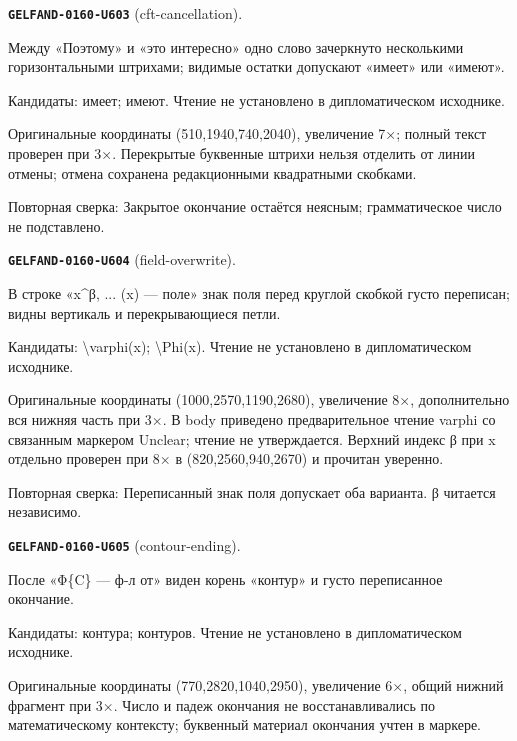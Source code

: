 \par\noindent\leavevmode{}\label{GELFAND-0160-U603}\label{GELFAND-P001483:cft-cancellation}\textbf{\texttt{GELFAND-0160-U603}} (cft-cancellation).\nopagebreak[4]\par
Между «Поэтому» и «это интересно» одно слово зачеркнуто несколькими горизонтальными штрихами; видимые остатки допускают «имеет» или «имеют».\par
Кандидаты: имеет; имеют. Чтение не установлено в дипломатическом исходнике.\par
Оригинальные координаты (510,1940,740,2040), увеличение 7×; полный текст проверен при 3×. Перекрытые буквенные штрихи нельзя отделить от линии отмены; отмена сохранена редакционными квадратными скобками.\par
Повторная сверка: Закрытое окончание остаётся неясным; грамматическое число не подставлено.\par\medskip
\par\noindent\leavevmode{}\label{GELFAND-0160-U604}\label{GELFAND-P001483:field-overwrite}\textbf{\texttt{GELFAND-0160-U604}} (field-overwrite).\nopagebreak[4]\par
В строке «x\textasciicircum{}β, ... (x) — поле» знак поля перед круглой скобкой густо переписан; видны вертикаль и перекрывающиеся петли.\par
Кандидаты: \textbackslash{}varphi(x); \textbackslash{}Phi(x). Чтение не установлено в дипломатическом исходнике.\par
Оригинальные координаты (1000,2570,1190,2680), увеличение 8×, дополнительно вся нижняя часть при 3×. В body приведено предварительное чтение varphi со связанным маркером Unclear; чтение не утверждается. Верхний индекс β при x отдельно проверен при 8× в (820,2560,940,2670) и прочитан уверенно.\par
Повторная сверка: Переписанный знак поля допускает оба варианта. β читается независимо.\par\medskip
\par\noindent\leavevmode{}\label{GELFAND-0160-U605}\label{GELFAND-P001483:contour-ending}\textbf{\texttt{GELFAND-0160-U605}} (contour-ending).\nopagebreak[4]\par
После «Φ\{C\} — ф-л от» виден корень «контур» и густо переписанное окончание.\par
Кандидаты: контура; контуров. Чтение не установлено в дипломатическом исходнике.\par
Оригинальные координаты (770,2820,1040,2950), увеличение 6×, общий нижний фрагмент при 3×. Число и падеж окончания не восстанавливались по математическому контексту; буквенный материал окончания учтен в маркере.\par
